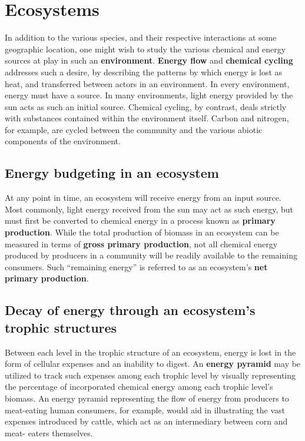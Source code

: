 \documentclass{article}
\begin{document}
\section{Ecosystems}

In addition to the various species, and their respective interactions at some
geographic location, one might wish to study the various chemical and energy sources
at play in such an \textbf{environment}. \textbf{Energy flow} and \textbf{chemical
cycling} addresses such a desire, by describing the patterns by which energy is lost
as heat, and transferred between actors in an environment. In every environment,
energy must have a source. In many environments, light energy provided by the sun acts
as such an initial source. Chemical cycling, by contrast, deals strictly with substances
contained within the environment itself. Carbon and nitrogen, for example, are cycled
between the community and the various abiotic components of the environment.

\subsection{Energy budgeting in an ecosystem}

At any point in time, an ecosystem will receive energy from an input source. Most
commonly, light energy received from the sun may act as such energy, but must first
be converted to chemical energy in a process known as \textbf{primary production}.
While the total production of biomass in an ecosystem can be measured in terms of
\textbf{gross primary production}, not all chemical energy produced by producers
in a community will be readily available to the remaining consumers. Such ``remaining
energy'' is referred to as an ecosystem's \textbf{net primary production}.

\subsection{Decay of energy through an ecosystem's trophic structures}

Between each level in the trophic structure of an ecosystem, energy is lost in the
form of cellular expenses and an inability to digest. An \textbf{energy pyramid}
may be utilized to track such expenses among each trophic level by visually
representing the percentage of incorporated chemical energy among each trophic
level's biomass. An energy pyramid representing the flow of energy from producers
to meat-eating human consumers, for example, would aid in illustrating the vast
expenses introduced by cattle, which act as an intermediary between corn and meat-
eaters themselves.
\end{document}
